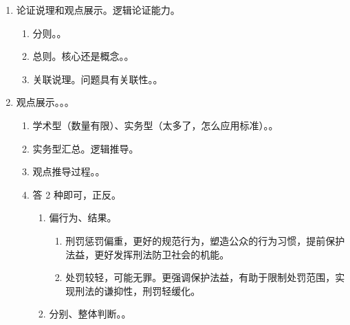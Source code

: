 \begin{enumerate}
\begin{enumerate}
          \item 阅读能力。发现考点，提炼考点的能力。
                \begin{enumerate}
                  \item 人物 + 线索。
                  \item 人物 + 行为。
                  \item 要求。不要漏点、读一遍能反映出啥考点、太长的读一段分析一段写一段。
                  \item 理不清。找被害人。
                \end{enumerate}
          \item 写作能力。文字组织、答题结构。
        \end{enumerate}
  \item 论证说理和观点展示。逻辑论证能力。
        \begin{enumerate}
          \item 分则。。
          \item 总则。核心还是概念。。
          \item 关联说理。问题具有关联性。。
        \end{enumerate}
  \item 观点展示。。。
        \begin{enumerate}
          \item 学术型（数量有限）、实务型（太多了，怎么应用标准）。。
          \item 实务型汇总。逻辑推导。
          \item 观点推导过程。。
          \item 答 2 种即可，正反。
                \begin{enumerate}
                  \item 偏行为、结果。
                        \begin{enumerate}
                          \item 刑罚惩罚偏重，更好的规范行为，塑造公众的行为习惯，提前保护法益，更好发挥刑法防卫社会的机能。
                          \item 处罚较轻，可能无罪。更强调保护法益，有助于限制处罚范围，实现刑法的谦抑性，刑罚轻缓化。
                        \end{enumerate}
                  \item 分别、整体判断。。
                        \begin{enumerate}

\end{enumerate}
\end{enumerate}
\end{enumerate}
\end{enumerate}
